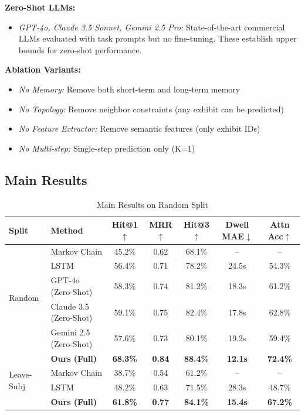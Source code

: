 \documentclass[letterpaper]{article}
\begin{document}
\textbf{Zero-Shot LLMs:}
\begin{itemize}
    \item \textit{GPT-4o, Claude 3.5 Sonnet, Gemini 2.5 Pro:} State-of-the-art commercial LLMs evaluated with task prompts but no fine-tuning. These establish upper bounds for zero-shot performance.
\end{itemize}

\textbf{Ablation Variants:}
\begin{itemize}
    \item \textit{No Memory:} Remove both short-term and long-term memory
    \item \textit{No Topology:} Remove neighbor constraints (any exhibit can be predicted)
    \item \textit{No Feature Extractor:} Remove semantic features (only exhibit IDs)
    \item \textit{No Multi-step:} Single-step prediction only (K=1)
\end{itemize}

\subsection{Main Results}

\begin{table}[h]
\centering
\caption{Main Results on Random Split}
\begin{tabular}{llccccc}
\toprule
Split & Method & Hit@1$\uparrow$ & MRR$\uparrow$ & Hit@3$\uparrow$ & Dwell MAE$\downarrow$ & Attn Acc$\uparrow$ \\
\midrule
\multirow{5}{*}{Random}
& Markov Chain & 45.2\% & 0.62 & 68.1\% & -- & -- \\
& LSTM & 56.4\% & 0.71 & 78.2\% & 24.5s & 54.3\% \\
& GPT-4o (Zero-Shot) & 58.3\% & 0.74 & 81.2\% & 18.3s & 61.2\% \\
& Claude 3.5 (Zero-Shot) & 59.1\% & 0.75 & 82.4\% & 17.8s & 62.8\% \\
& Gemini 2.5 (Zero-Shot) & 57.6\% & 0.73 & 80.1\% & 19.2s & 59.4\% \\
& \textbf{Ours (Full)} & \textbf{68.3\%} & \textbf{0.84} & \textbf{88.4\%} & \textbf{12.1s} & \textbf{72.4\%} \\
\midrule
\multirow{2}{*}{Leave-Subj}
& Markov Chain & 38.7\% & 0.54 & 61.2\% & -- & -- \\
& LSTM & 48.2\% & 0.63 & 71.5\% & 28.3s & 48.7\% \\
& \textbf{Ours (Full)} & \textbf{61.8\%} & \textbf{0.77} & \textbf{84.1\%} & \textbf{15.4s} & \textbf{67.2\%} \\
\bottomrule
\end{tabular}
\label{tab:main_results}
\end{table}
\end{document}
